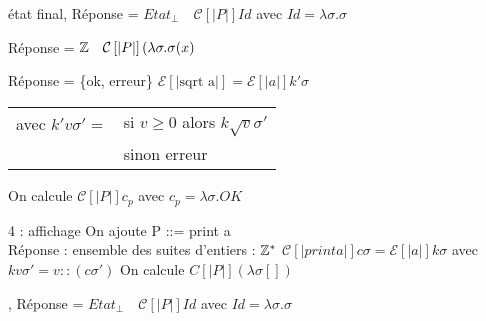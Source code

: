 \documentclass[10pt,a4paper]{article}
\newcommand{\E}{\mathcal{E}}
\newcommand{\semm}[1]{\left[| #1 | \right]}
\begin{document}
\begin{ex}{1} état final, Réponse = $Etat_{\perp} \quad \mathcal{C}\semm{P} Id$ avec $Id = \lambda \sigma . \sigma$
\end{ex}
\begin{ex}{2}  Réponse = $\Z \quad \mathcal{C}\semm{P} ( \lambda \sigma . \sigma(x)$
\end{ex}
\begin{ex}{3}  Réponse = \{ok, erreur\} $\E\semm{\text{sqrt a}} = \E\semm{a} k' \sigma$ 
\begin{tabular}{ll}
 avec $k' v \sigma' = $ & si $v \geq 0$ alors $ k \sqrt{v} \sigma'$\\
  & sinon erreur\\
\end{tabular}
On calcule $\mathcal{C}\semm{P} c_p$ avec $c_p = \lambda \sigma . OK$
\end{ex}
\begin{ex}{4 : affichage} On ajoute P ::= print a\\
Réponse : ensemble des suites d'entiers : $\mathbb{Z}^*$
$\mathcal{C}\semm{print a} c \sigma = \E\semm{a} k \sigma$ avec $k v \sigma' = v::(c \sigma')$
On calcule ${C}\semm{P} (\lambda \sigma [])$

, Réponse = $Etat_{\perp} \quad \mathcal{C}\semm{P} Id$ avec $Id = \lambda \sigma . \sigma$
\end{ex}
\end{document}
